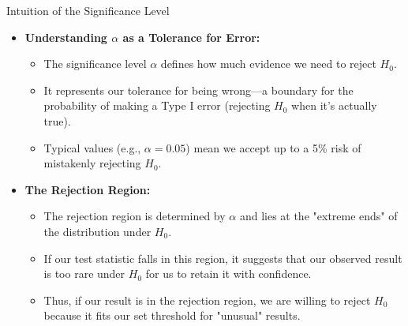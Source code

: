 \documentclass[handout]{beamer} %
\begin{document}
\begin{frame}{Intuition of the Significance Level}
    \begin{itemize}
        \item \textbf{Understanding \( \alpha \) as a Tolerance for Error:}
        \begin{itemize}
            \item The significance level \( \alpha \) defines how much evidence we need to reject \( H_0 \).
            \item It represents our tolerance for being wrong—a boundary for the probability of making a Type I error (rejecting \( H_0 \) when it’s actually true).
            \item Typical values (e.g., \( \alpha = 0.05 \)) mean we accept up to a 5\% risk of mistakenly rejecting \( H_0 \).
        \end{itemize}

        \item \textbf{The Rejection Region:}
        \begin{itemize}
            \item The rejection region is determined by \( \alpha \) and lies at the "extreme ends" of the distribution under \( H_0 \).
            \item If our test statistic falls in this region, it suggests that our observed result is too rare under \( H_0 \) for us to retain it with confidence.
            \item Thus, if our result is in the rejection region, we are willing to reject \( H_0 \) because it fits our set threshold for "unusual" results.
        \end{itemize}

    
    \end{itemize}
\end{frame}
\end{document}
